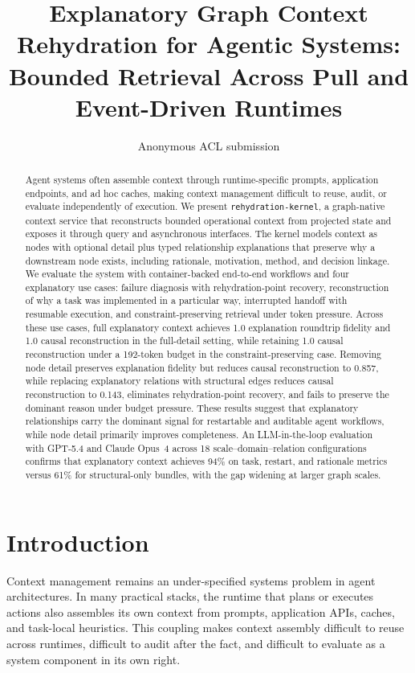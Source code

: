 \documentclass[11pt]{article}
\title{Explanatory Graph Context Rehydration for Agentic Systems:\\Bounded Retrieval Across Pull and Event-Driven Runtimes}
\author{Anonymous ACL submission}
\begin{document}
\maketitle

\begin{abstract}
Agent systems often assemble context through runtime-specific prompts,
application endpoints, and ad hoc caches, making context management difficult
to reuse, audit, or evaluate independently of execution. We present
\texttt{rehydration-kernel}, a graph-native context service that reconstructs
bounded operational context from projected state and exposes it through query
and asynchronous interfaces. The kernel models context as nodes with optional
detail plus typed relationship explanations that preserve why a downstream node
exists, including rationale, motivation, method, and decision linkage. We
evaluate the system with container-backed end-to-end workflows and four
explanatory use cases: failure diagnosis with rehydration-point recovery,
reconstruction of why a task was implemented in a particular way, interrupted
handoff with resumable execution, and constraint-preserving retrieval under
token pressure. Across these use cases, full explanatory context achieves
\mbox{1.0} explanation roundtrip fidelity and \mbox{1.0} causal
reconstruction in the full-detail setting, while retaining \mbox{1.0} causal
reconstruction under a \mbox{192}-token budget in the constraint-preserving
case. Removing node detail preserves explanation fidelity but reduces causal
reconstruction to \mbox{0.857}, while replacing explanatory relations with
structural edges reduces causal reconstruction to \mbox{0.143}, eliminates
rehydration-point recovery, and fails to preserve the dominant reason under
budget pressure. These results suggest that explanatory relationships carry
the dominant signal for restartable and auditable agent workflows, while node
detail primarily improves completeness. An LLM-in-the-loop evaluation with
GPT-5.4 and Claude Opus~4 across 18 scale--domain--relation configurations
confirms that explanatory context achieves 94\% on task, restart, and rationale
metrics versus 61\% for structural-only bundles, with the gap widening at
larger graph scales.
\end{abstract}

\section{Introduction}

Context management remains an under-specified systems problem in agent
architectures. In many practical stacks, the runtime that plans or executes
actions also assembles its own context from prompts, application APIs, caches,
and task-local heuristics. This coupling makes context assembly difficult to
reuse across runtimes, difficult to audit after the fact, and difficult to
evaluate as a system component in its own right.
\end{document}
